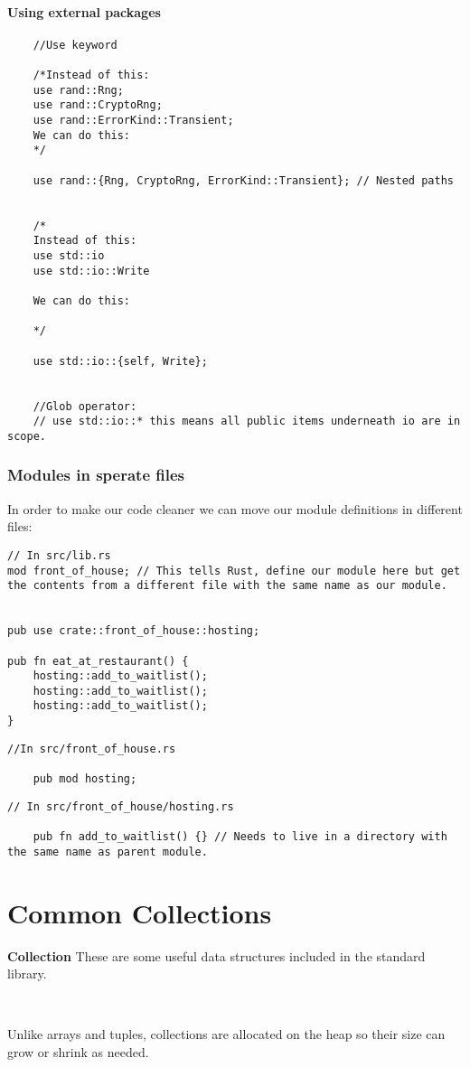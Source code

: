 \paragraph*{Using external packages}
\begin{lstlisting}
    //Use keyword

    /*Instead of this:
    use rand::Rng;
    use rand::CryptoRng;
    use rand::ErrorKind::Transient;
    We can do this:
    */
    
    use rand::{Rng, CryptoRng, ErrorKind::Transient}; // Nested paths
    
     
    /*
    Instead of this:
    use std::io
    use std::io::Write
    
    We can do this:
    
    */
    
    use std::io::{self, Write};
    
    
    //Glob operator:
    // use std::io::* this means all public items underneath io are in scope.     
\end{lstlisting}

\newpage
\subsubsection{Modules in sperate files}
In order to make our code cleaner we can move our module definitions in different files:
\begin{lstlisting}
// In src/lib.rs
mod front_of_house; // This tells Rust, define our module here but get the contents from a different file with the same name as our module.


pub use crate::front_of_house::hosting;

pub fn eat_at_restaurant() {
    hosting::add_to_waitlist();
    hosting::add_to_waitlist();
    hosting::add_to_waitlist();
}
\end{lstlisting}

\begin{lstlisting}
//In src/front_of_house.rs

    pub mod hosting;
\end{lstlisting}

\begin{lstlisting}
// In src/front_of_house/hosting.rs

    pub fn add_to_waitlist() {} // Needs to live in a directory with the same name as parent module.        
\end{lstlisting}

\section{Common Collections}
\begin{definition}
    \textbf{Collection}
These are some useful data structures included in the standard library.

\

Unlike arrays and tuples, collections are allocated on the heap so their size can grow or shrink as needed.
\end{definition}

